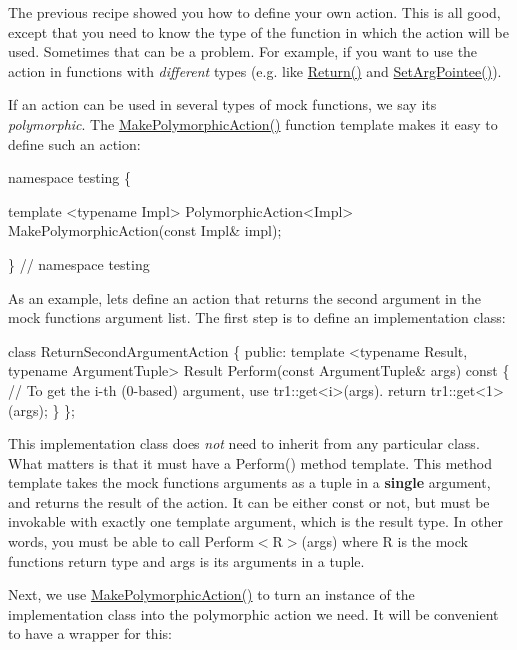 The previous recipe showed you how to define your own action. This is all good, except that you need to know the type of the function in which the action will be used. Sometimes that can be a problem. For example, if you want to use the action in functions with {\itshape different} types (e.\+g. like {\ttfamily \hyperlink{namespacetesting_af6d1c13e9376c77671e37545cd84359c}{Return()}} and {\ttfamily \hyperlink{namespacetesting_a5740a5033b88c37666fcd09a269d123f}{Set\+Arg\+Pointee()}}).

If an action can be used in several types of mock functions, we say it\textquotesingle{}s {\itshape polymorphic}. The {\ttfamily \hyperlink{namespacetesting_a36bd06c5ea972c6df0bd9f40a7a94c65}{Make\+Polymorphic\+Action()}} function template makes it easy to define such an action\+:


\begin{DoxyCode}
namespace testing \{

template <typename Impl>
PolymorphicAction<Impl> MakePolymorphicAction(const Impl& impl);

\}  // namespace testing
\end{DoxyCode}


As an example, let\textquotesingle{}s define an action that returns the second argument in the mock function\textquotesingle{}s argument list. The first step is to define an implementation class\+:


\begin{DoxyCode}
class ReturnSecondArgumentAction \{
 public:
  template <typename Result, typename ArgumentTuple>
  Result Perform(const ArgumentTuple& args) const \{
    // To get the i-th (0-based) argument, use tr1::get<i>(args).
    return tr1::get<1>(args);
  \}
\};
\end{DoxyCode}


This implementation class does {\itshape not} need to inherit from any particular class. What matters is that it must have a {\ttfamily Perform()} method template. This method template takes the mock function\textquotesingle{}s arguments as a tuple in a {\bfseries single} argument, and returns the result of the action. It can be either {\ttfamily const} or not, but must be invokable with exactly one template argument, which is the result type. In other words, you must be able to call {\ttfamily Perform$<$R$>$(args)} where {\ttfamily R} is the mock function\textquotesingle{}s return type and {\ttfamily args} is its arguments in a tuple.

Next, we use {\ttfamily \hyperlink{namespacetesting_a36bd06c5ea972c6df0bd9f40a7a94c65}{Make\+Polymorphic\+Action()}} to turn an instance of the implementation class into the polymorphic action we need. It will be convenient to have a wrapper for this\+:


